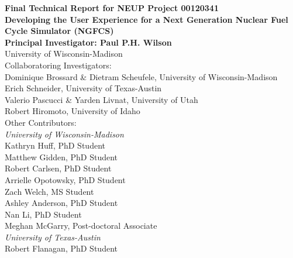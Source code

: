 
\begin{titlepage}
  \begin{center}
    {\Large\bfseries Final Technical Report for NEUP Project 00120341}\\[1cm]
    {\huge\bfseries Developing the User Experience for a Next Generation Nuclear Fuel Cycle Simulator (NGFCS)}\\

    \vspace{2cm}
    {\bfseries Principal Investigator: Paul P.H. Wilson}\\[5pt]
    University of Wisconsin-Madison\\

    \vspace{2cm}
    Collaboratoring Investigators:\\[5pt]
    Dominique Brossard \& Dietram Scheufele, University of Wisconsin-Madison\\
    Erich Schneider, University of Texas-Austin\\
    Valerio Pascucci \& Yarden Livnat, University of Utah\\
    Robert Hiromoto, University of Idaho\\

    \vspace{2cm}
    Other Contributors:\\[5pt]
    \textit{University of Wisconsin-Madison}\\
    Kathryn Huff, PhD Student\\
    Matthew Gidden, PhD Student\\
    Robert Carlsen, PhD Student\\
    Arrielle Opotowsky, PhD Student\\
    Zach Welch, MS Student\\
    Ashley Anderson, PhD Student\\
    Nan Li, PhD Student\\
    Meghan McGarry, Post-doctoral Associate\\[10pt]
    \textit{University of Texas-Austin}\\
    Robert Flanagan, PhD Student\\
    \vfill



    
  \end{center}
\end{titlepage}
